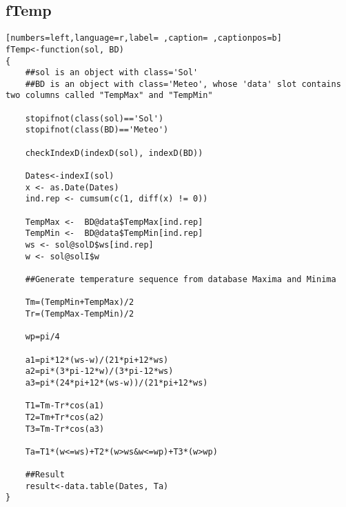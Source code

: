 \subsection{fTemp}
\label{sec:org1ea7847}
\begin{lstlisting}[numbers=left,language=r,label= ,caption= ,captionpos=b]
fTemp<-function(sol, BD)
{
    ##sol is an object with class='Sol'
    ##BD is an object with class='Meteo', whose 'data' slot contains two columns called "TempMax" and "TempMin"

    stopifnot(class(sol)=='Sol')
    stopifnot(class(BD)=='Meteo')

    checkIndexD(indexD(sol), indexD(BD))

    Dates<-indexI(sol)	
    x <- as.Date(Dates)
    ind.rep <- cumsum(c(1, diff(x) != 0))

    TempMax <-  BD@data$TempMax[ind.rep]
    TempMin <-  BD@data$TempMin[ind.rep]
    ws <- sol@solD$ws[ind.rep]
    w <- sol@solI$w

    ##Generate temperature sequence from database Maxima and Minima

    Tm=(TempMin+TempMax)/2
    Tr=(TempMax-TempMin)/2

    wp=pi/4

    a1=pi*12*(ws-w)/(21*pi+12*ws)
    a2=pi*(3*pi-12*w)/(3*pi-12*ws)
    a3=pi*(24*pi+12*(ws-w))/(21*pi+12*ws)

    T1=Tm-Tr*cos(a1)
    T2=Tm+Tr*cos(a2)
    T3=Tm-Tr*cos(a3)

    Ta=T1*(w<=ws)+T2*(w>ws&w<=wp)+T3*(w>wp)

    ##Result
    result<-data.table(Dates, Ta)
}
\end{lstlisting}
